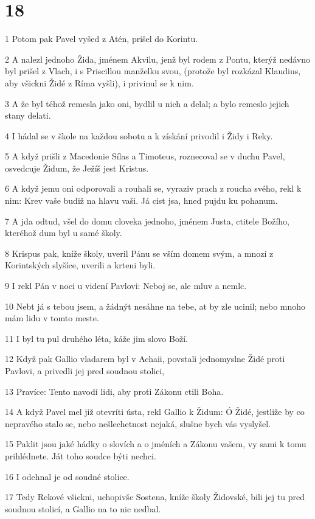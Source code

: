 \chapter{18}

\par 1 Potom pak Pavel vyšed z Atén, prišel do Korintu.
\par 2 A nalezl jednoho Žida, jménem Akvilu, jenž byl rodem z Pontu, kterýž nedávno byl prišel z Vlach, i s Priscillou manželku svou, (protože byl rozkázal Klaudius, aby všickni Židé z Ríma vyšli), i privinul se k nim.
\par 3 A že byl téhož remesla jako oni, bydlil u nich a delal; a bylo remeslo jejich stany delati.
\par 4 I hádal se v škole na každou sobotu a k získání privodil i Židy i Reky.
\par 5 A když prišli z Macedonie Sílas a Timoteus, roznecoval se v duchu Pavel, osvedcuje Židum, že Ježíš jest Kristus.
\par 6 A když jemu oni odporovali a rouhali se, vyraziv prach z roucha svého, rekl k nim: Krev vaše budiž na hlavu vaši. Já cist jsa, hned pujdu ku pohanum.
\par 7 A jda odtud, všel do domu cloveka jednoho, jménem Justa, ctitele Božího, kteréhož dum byl u samé školy.
\par 8 Krispus pak, kníže školy, uveril Pánu se vším domem svým, a mnozí z Korintských slyšíce, uverili a krteni byli.
\par 9 I rekl Pán v noci u videní Pavlovi: Neboj se, ale mluv a nemlc.
\par 10 Nebt já s tebou jsem, a žádnýt nesáhne na tebe, at by zle ucinil; nebo mnoho mám lidu v tomto meste.
\par 11 I byl tu pul druhého léta, káže jim slovo Boží.
\par 12 Když pak Gallio vladarem byl v Achaii, povstali jednomyslne Židé proti Pavlovi, a privedli jej pred soudnou stolici,
\par 13 Pravíce: Tento navodí lidi, aby proti Zákonu ctili Boha.
\par 14 A když Pavel mel již otevríti ústa, rekl Gallio k Židum: Ó Židé, jestliže by co nepravého stalo se, nebo nešlechetnost nejaká, slušne bych vás vyslyšel.
\par 15 Paklit jsou jaké hádky o slovích a o jméních a Zákonu vašem, vy sami k tomu prihlédnete. Ját toho soudce býti nechci.
\par 16 I odehnal je od soudné stolice.
\par 17 Tedy Rekové všickni, uchopivše Sostena, kníže školy Židovské, bili jej tu pred soudnou stolicí, a Gallio na to nic nedbal.
